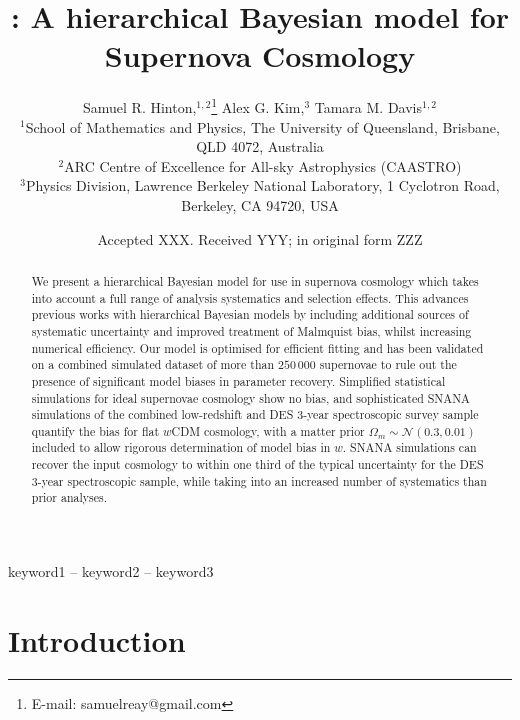 \documentclass[a4paper,fleqn,usenatbib]{mnras}
\title[\name]{\name: A hierarchical Bayesian model for Supernova Cosmology}
\author[S. R. Hinton et al.]{
	Samuel R. Hinton,$^{1,2}$\thanks{E-mail: samuelreay@gmail.com}
	Alex G. Kim,$^{3}$
	Tamara M. Davis$^{1,2}$
	\\
	$^{1}$School of Mathematics and Physics, The University of Queensland, Brisbane, QLD 4072, Australia\\
	$^{2}$ARC Centre of Excellence for All-sky Astrophysics (CAASTRO)\\
	$^{3}$Physics Division, Lawrence Berkeley National Laboratory, 1 Cyclotron Road, Berkeley, CA 94720, USA
}
\date{Accepted XXX. Received YYY; in original form ZZZ}
\begin{document}
\label{firstpage}
\pagerange{\pageref{firstpage}--\pageref{lastpage}}
\maketitle






\begin{abstract}
We present a hierarchical Bayesian model for use in supernova cosmology which takes into account a full range of analysis systematics and selection effects. This advances previous works with hierarchical Bayesian models by including additional sources of systematic uncertainty and improved treatment of Malmquist bias, whilst increasing numerical efficiency. Our model is optimised for efficient fitting and has been validated on a combined simulated dataset of more than $250\,000$ supernovae to rule out the presence of significant model biases in parameter recovery. Simplified statistical simulations for ideal supernovae cosmology show no bias, and sophisticated SNANA simulations of the combined low-redshift and DES 3-year spectroscopic survey sample quantify the bias for flat $w$CDM cosmology, with a matter prior $\Omega_m \sim \mathcal{N}(0.3, 0.01)$ included to allow rigorous determination of model bias in $w$. SNANA simulations can recover the input cosmology to within one third of the typical uncertainty for the DES 3-year spectroscopic sample, while taking into an increased number of systematics than prior analyses.
\end{abstract}

\begin{keywords}
keyword1 -- keyword2 -- keyword3
\end{keywords}










\section{Introduction}
\end{document}
